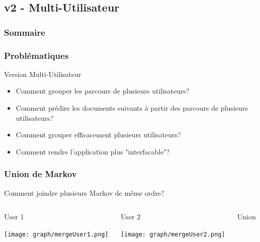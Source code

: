 \documentclass{beamer}
\begin{document}
        \subsection{v2 - Multi-Utilisateur}
            \begin{frame}
                \frametitle{Sommaire}
            \end{frame}
        \begin{frame}
        \frametitle{Problématiques}
        Version Multi-Utilisateur
        \pause
        \begin{itemize}
        \item Comment grouper les parcours de plusieurs utilisateurs?
        \pause
        \item Comment prédire les documents suivants à partir des parcours de plusieurs utilisateurs?
        \pause
        \item Comment grouper efficacement plusieurs utilisateurs?
        \pause
        \item Comment rendre l'application plus "interfacable"?
        \end{itemize}
        \end{frame}
        \begin{frame}
        \frametitle{Union de Markov}
        Comment joindre plusieurs Markov de même ordre?
        \pause[2]
        \begin{columns}[t]
        \begin{column}{3cm}
        \begin{exampleblock}{User 1}
        \begin{center}
        \texttt{[image: graph/mergeUser1.png]}
        \end{center}
        \end{exampleblock}
        \end{column}
        \begin{column}{3cm}
        \begin{exampleblock}{User 2}
        \begin{center}
        \texttt{[image: graph/mergeUser2.png]}
        \end{center}
        \end{exampleblock}
        \end{column}
        \pause[3]
        \begin{column}{3cm}
        \begin{exampleblock}{Union}
        \begin{center}
        \pause[4]
        \end{center}
        \end{exampleblock}
        \end{column}
        \end{columns}
        \end{frame}
\end{document}
